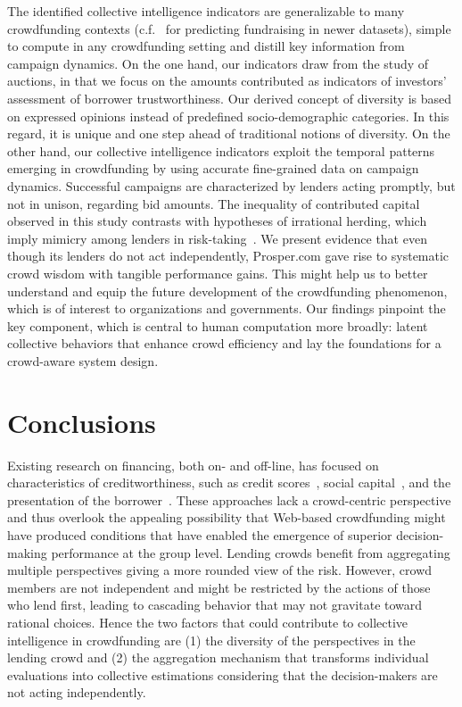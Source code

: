 \documentclass[sigconf]{acmart}
\begin{document}
The identified collective intelligence indicators are generalizable to many crowdfunding contexts (c.f.~\cite{dambanemuya2021multi} for predicting fundraising in newer datasets), simple to compute in any crowdfunding setting and distill key information from campaign dynamics. On the one hand, our indicators draw from the study of auctions, in that we focus on the amounts contributed as indicators of investors' assessment of borrower trustworthiness. Our derived concept of diversity is based on expressed opinions instead of predefined socio-demographic categories. In this regard, it is unique and one step ahead of traditional notions of diversity. On the other hand, our collective intelligence indicators exploit the temporal patterns emerging in crowdfunding by using accurate fine-grained data on campaign dynamics. Successful campaigns are characterized by lenders acting promptly, but not in unison, regarding bid amounts. The inequality of contributed capital observed in this study contrasts with hypotheses of irrational herding, which imply mimicry among lenders in risk-taking~\cite{Zhang2012}. We present evidence that even though its lenders do not act independently, Prosper.com gave rise to systematic crowd wisdom with tangible performance gains. This might help us to better understand and equip the future development of the crowdfunding phenomenon, which is of interest to organizations and governments. Our findings pinpoint the key component, which is central to human computation more broadly: latent collective behaviors that enhance crowd efficiency and lay the foundations for a crowd-aware system design.

\vspace{-1em}
\section{Conclusions}
Existing research on financing, both on- and off-line, has focused on characteristics of creditworthiness, such as credit scores~\cite{abdou2011credit,iyer2015screening}, social capital~\cite{Granovetter1985,uzzi1999embeddedness,Freedman2008,Greenberg2013,Lin2013,horvat2015network}, and the presentation of the borrower~\cite{Duarte2012,brooks2014investors,althoff2014ask}. These approaches lack a crowd-centric perspective and thus overlook the appealing possibility that Web-based crowdfunding might have produced conditions that have enabled the emergence of superior decision-making performance at the group level. Lending crowds benefit from aggregating multiple perspectives giving a more rounded view of the risk. However, crowd members are not independent and might be restricted by the actions of those who lend first, leading to cascading behavior that may not gravitate toward rational choices. Hence the two factors that could contribute to collective intelligence in crowdfunding are (1) the diversity of the perspectives in the lending crowd and (2) the aggregation mechanism that transforms individual evaluations into collective estimations considering that the decision-makers are not acting independently.
\end{document}
